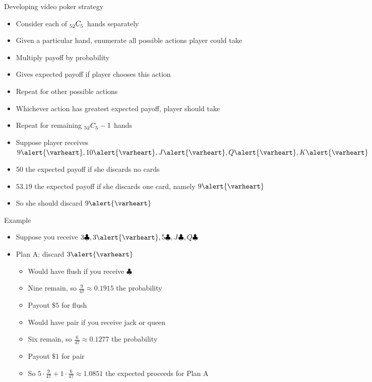 \documentclass[xcolor=dvipsnames]{beamer}
\theoremstyle{definition}
\newcommand\ncr[2]{\tensor[_{#1}]C{_{#2}}}
\newcommand{\hs}{\alert{\varheart}}
\newcommand{\cs}{\clubsuit}
\begin{document}
\begin{frame}{Developing video poker strategy}
\begin{itemize}
\item Consider each of $\ncr{52}{5}$ hands separately
\item Given a particular hand, enumerate
all possible actions player could take
\item Multiply payoff by probability
\item Gives expected payoff if player chooses this action
\item Repeat for other possible actions
\item Whichever action has greatest
expected payoff, player should take
\item Repeat for remaining $\ncr{52}{5}-1$ hands
\end{itemize}
\begin{example}
\begin{itemize}
\item Suppose player receives $9\hs,10\hs,J\hs,Q\hs,K\hs$
\item $50$ the expected payoff if she discards no cards
\item $53.19$ the expected payoff if she discards
one card, namely $9\hs$
\item So she should discard $9\hs$
\end{itemize}
\end{example}
\end{frame}

\begin{frame}{Example}
\begin{itemize}
\item Suppose you receive
$3\cs,3\hs,5\cs,J\cs,Q\cs$
\item Plan A: discard $3\hs$
\begin{itemize}
\item Would have flush if you receive $\cs$
\item Nine remain, so $\frac{9}{47}\approx
0.1915$ the probability
\item Payout $\$5$ for flush
\item Would have pair if you receive jack or queen
\item Six remain, so $\frac{6}{47}\approx 0.1277$
the probability
\item Payout $\$1$ for pair
\item So $5\cdot\frac{9}{47}+1\cdot\frac{6}{47}
\approx 1.0851$ the expected proceeds for Plan A
\end{itemize}
\end{itemize}
\end{frame}
\end{document}
